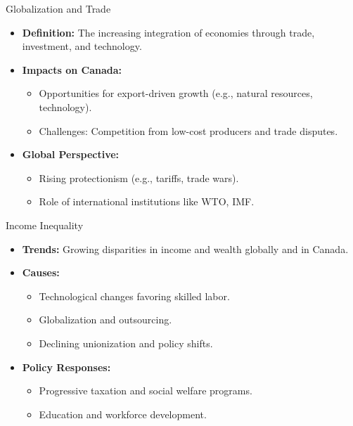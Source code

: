 \documentclass{beamer}
\begin{document}
\begin{frame}{Globalization and Trade}
  \begin{itemize}
    \item \textbf{Definition:} The increasing integration of economies through trade, investment, and technology.
    \item \textbf{Impacts on Canada:}
      \begin{itemize}
        \item Opportunities for export-driven growth (e.g., natural resources, technology).
        \item Challenges: Competition from low-cost producers and trade disputes.
      \end{itemize}
    \item \textbf{Global Perspective:}
      \begin{itemize}
        \item Rising protectionism (e.g., tariffs, trade wars).
        \item Role of international institutions like WTO, IMF.
      \end{itemize}
  \end{itemize}
\end{frame}

\begin{frame}{Income Inequality}
  \begin{itemize}
    \item \textbf{Trends:} Growing disparities in income and wealth globally and in Canada.
    \item \textbf{Causes:}
      \begin{itemize}
        \item Technological changes favoring skilled labor.
        \item Globalization and outsourcing.
        \item Declining unionization and policy shifts.
      \end{itemize}
    \item \textbf{Policy Responses:}
      \begin{itemize}
        \item Progressive taxation and social welfare programs.
        \item Education and workforce development.
      \end{itemize}
  \end{itemize}
\end{frame}
\end{document}
